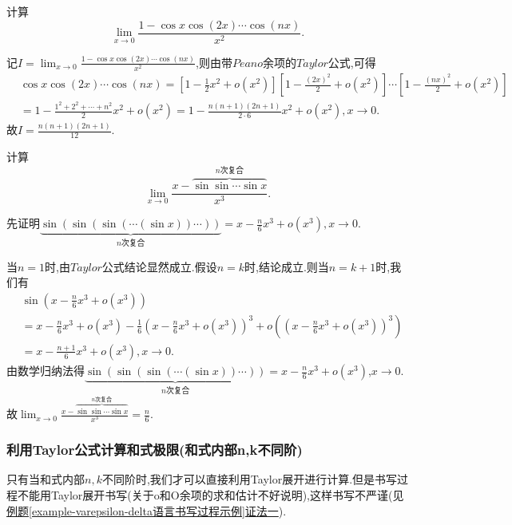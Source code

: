 \documentclass[lang=cn,newtx,10pt,scheme=chinese]{elegantbook}
\begin{document}
\begin{example}
   计算
\[
\lim_{x \to 0} \frac{1 - \cos x \cos(2x) \cdots \cos(nx)}{x^2}.
\]
\end{example}
\begin{solution}
记$I=\lim_{x \to 0} \frac{1 - \cos x \cos(2x) \cdots \cos(nx)}{x^2}$,则由带$Peano$余项的$Taylor$公式,可得
\begin{align*}
   &\cos x \cos(2x) \cdots \cos(nx)
   =\left[1 - \frac{1}{2}x^2 + o(x^2)\right]\left[1 - \frac{(2x)^2}{2} + o(x^2)\right] \cdots \left[1 - \frac{(nx)^2}{2} + o(x^2)\right]
   \\
   &= 1 - \frac{1^2 + 2^2 + \cdots + n^2}{2}x^2 + o(x^2)
   = 1 - \frac{n(n + 1)(2n + 1)}{2 \cdot 6}x^2 + o(x^2),x\to0.
\end{align*}
故\(I = \frac{n(n + 1)(2n + 1)}{12}\).
\end{solution}

\begin{example}
   计算
\[
\lim_{x\rightarrow 0} \frac{x-\overset{n\text{次复合}}{\overbrace{\sin\sin \cdots \sin x}}}{x^3}.
\]
\end{example}
\begin{solution}
   先证明\(\underbrace{\sin(\sin(\sin(\cdots (\sin x))\cdots))}_{n\text{次复合}} = x - \frac{n}{6}x^3 + o(x^3),x\to0\).

当\(n = 1\)时,由$Taylor$公式结论显然成立.假设\(n=k\)时,结论成立.则当\(n=k + 1\)时,我们有
\begin{align*}
   &\sin\left(x - \frac{n}{6}x^3 + o(x^3)\right)
   \\
   &= x - \frac{n}{6}x^3 + o(x^3) - \frac{1}{6}\left(x - \frac{n}{6}x^3 + o(x^3)\right)^3 + o\left(\left(x - \frac{n}{6}x^3 + o(x^3)\right)^3\right)
   \\
   &= x - \frac{n + 1}{6}x^3 + o(x^3),x\to0.
\end{align*}
由数学归纳法得\(\underbrace{\sin(\sin(\sin(\cdots (\sin x))\cdots))}_{n\text{次复合}} = x - \frac{n}{6}x^3 + o(x^3)\),$x\to0$.
故$\lim_{x\rightarrow 0} \frac{x-\overset{n\text{次复合}}{\overbrace{\sin\sin \cdots \sin x}}}{x^3}=\frac{n}{6}.$
\end{solution}

\subsubsection{利用Taylor公式计算和式极限(和式内部n,k不同阶)}

只有当和式内部$n,k$不同阶时,我们才可以直接利用Taylor展开进行计算.但是书写过程不能用Taylor展开书写(关于o和O余项的求和估计不好说明),这样书写不严谨(见\hyperref[example-varepsilon-delta语言书写过程示例]{例题\ref{example-varepsilon-delta语言书写过程示例}证法一}).
\end{document}
